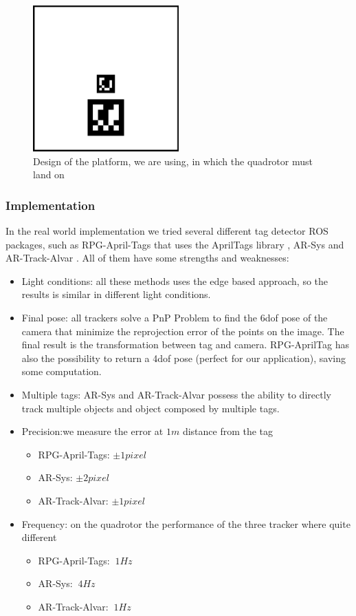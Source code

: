 \begin{figure}[!htbp]
    \centering
    \includegraphics[width=0.5\textwidth]{img/tempbase.png}
    \caption{Design of the platform, we are using, in which the quadrotor must land on}
    \label{fig:tempplatform}
\end{figure}

\subsubsection{Implementation}
In the real world implementation we tried several different tag detector ROS packages, such as  RPG-April-Tags \cite{rpgapriltags} that uses the  AprilTags library \cite{apriltagslibrary}, AR-Sys \cite{arsys} and AR-Track-Alvar \cite{artrackalvar}.
All of them have some strengths and weaknesses:
\begin{itemize}
\item Light conditions: all these methods uses the edge based approach, so the results is similar in different light conditions.
\item Final pose: all trackers solve a PnP Problem to find the 6dof pose of the camera that minimize the reprojection error of the points on the image. The final result is the transformation between tag and camera. RPG-AprilTag has also the possibility to return a 4dof pose (perfect for our application), saving some computation.
\item Multiple tags: AR-Sys and AR-Track-Alvar possess the ability to directly track multiple objects and object composed by multiple tags.
\item Precision:we measure the error at $1m$ distance from the tag
\begin{itemize}
\item RPG-April-Tags: $\pm 1 pixel $ 
\item AR-Sys: $\pm 2 pixel $
\item AR-Track-Alvar: $\pm 1 pixel $
\end{itemize}
\item Frequency: on the quadrotor the performance of the three tracker where quite different
\begin{itemize}
\item RPG-April-Tags: $~1Hz$
\item AR-Sys: $~4Hz$
\item AR-Track-Alvar: $~1Hz$
\end{itemize}
\end{itemize}

